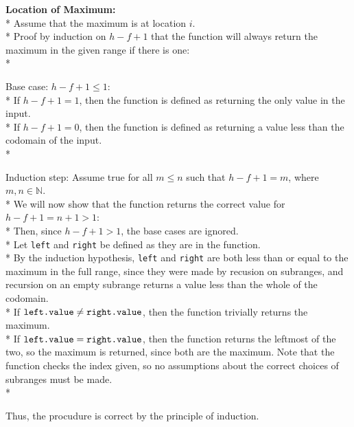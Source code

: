 \documentclass[letterpaper, reqno, 11pt]{article}
\newcommand{\NN}{\mathbb{N}}
\begin{document}
\begin{description}
	\item{\bf Location of Maximum:}\\*
	Assume that the maximum is at location $i$.\\*
	Proof by induction on $h-f+1$
	that the function will always return the maximum in the given range if there is one:\\*
	\begin{description}
		\item{Base case:} $h-f+1\leq1$:\\*
		If $h-f+1=1$,
		then the function is defined as returning the only value in the input.\\*
		If $h-f+1=0$,
		then the function is defined as returning
		a value less than the codomain of the input.\\*
		\item{Induction step:} Assume true for all $m\leq n$ such that $h-f+1=m$, where $m,n\in\NN$.\\*
		We will now show that the function returns the correct value for $h-f+1=n+1>1$:\\*
		Then, since $h-f+1>1$, the base cases are ignored.\\*
		Let \verb|left| and \verb|right| be defined as they are in the function.\\*
		By the induction hypothesis, \verb|left| and \verb|right| are both less than or equal
		to the maximum in the full range, since they were made by recusion on subranges,
		and recursion on an empty subrange returns a value less than the whole of the codomain.\\*
		If $\verb|left.value|\neq\verb|right.value|$, then the function trivially returns the maximum.\\*
		If $\verb|left.value|=\verb|right.value|$, then the function returns the leftmost of the two,
		so the maximum is returned, since both are the maximum.
		Note that the function checks the index given, so no assumptions about the correct choices
		of subranges must be made.\\*
	\end{description}
	Thus, the procudure is correct by the principle of induction.


\end{description}
\end{document}

